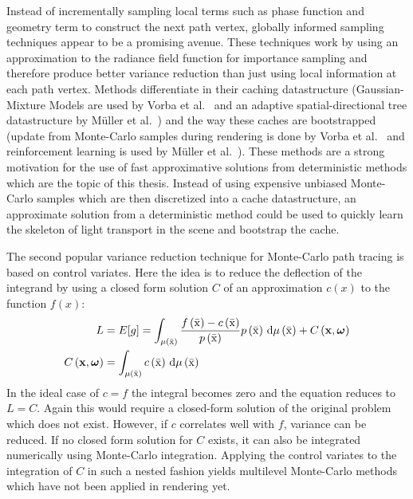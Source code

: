 Instead of incrementally sampling local terms such as phase function and geometry term to construct the next path vertex, globally informed sampling techniques appear to be a promising avenue. These techniques work by using an approximation to the radiance field function for importance sampling and therefore produce better variance reduction than just using local information at each path vertex. Methods differentiate in their caching datastructure (Gaussian-Mixture Models are used by Vorba et al.~\cite{Vorba14} and an adaptive spatial-directional tree datastructure by M\"{u}ller et al.~\cite{Mueller17}) and the way these caches are bootstrapped (update from Monte-Carlo samples during rendering is done by Vorba et al.~\cite{Vorba14} and reinforcement learning is used by M\"{u}ller et al.~\cite{Mueller17}). These methods are a strong motivation for the use of fast approximative solutions from deterministic methods which are the topic of this thesis. Instead of using expensive unbiased Monte-Carlo samples which are then discretized into a cache datastructure, an approximate solution from a deterministic method could be used to quickly learn the skeleton of light transport in the scene and bootstrap the cache.

The second popular variance reduction technique for Monte-Carlo path tracing is based on control variates. Here the idea is to reduce the deflection of the integrand by using a closed form solution $C$ of an approximation $c\left(x\right)$ to the function $f\left(x\right)$:
\begin{align}
L &= E[g] =
\int_{\mu\left(\bar{\mathrm{x}}\right)}
\frac{f\left(\bar{\mathrm{x}}\right)-c\left(\bar{\mathrm{x}}\right)}{p\left(\bar{\mathrm{x}}\right)}p\left(\bar{\mathrm{x}}\right)
\,\mathrm{d}\mu\left(\bar{\mathrm{x}}\right)
+C\left(\boldsymbol{\mathbf{x}}, \boldsymbol{\mathbf{\omega}}\right)
\\
C\left(\boldsymbol{\mathbf{x}}, \boldsymbol{\mathbf{\omega}}\right) &= 
\int_{\mu\left(\bar{\mathrm{x}}\right)}
c\left(\bar{\mathrm{x}}\right)
\,\mathrm{d}\mu\left(\bar{\mathrm{x}}\right)
\end{align}
In the ideal case of $c=f$ the integral becomes zero and the equation reduces to $L=C$. Again this would require a closed-form solution of the original problem which does not exist. However, if $c$ correlates well with $f$, variance can be reduced. If no closed form solution for $C$ exists, it can also be integrated numerically using Monte-Carlo integration. Applying the control variates to the integration of $C$ in such a nested fashion yields multilevel Monte-Carlo methods which have not been applied in rendering yet. 

